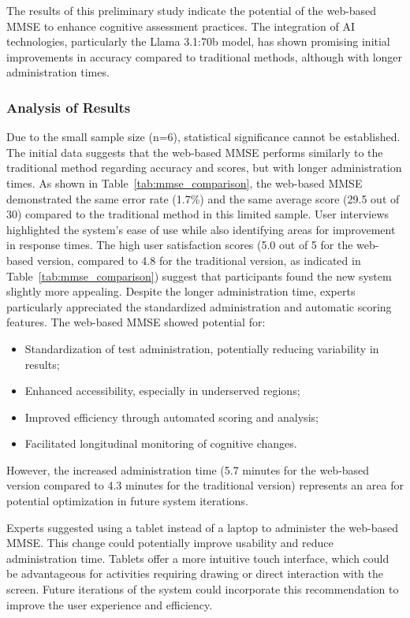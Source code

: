 The results of this preliminary study indicate the potential of the web-based MMSE to enhance cognitive assessment practices. The integration of AI technologies, particularly the Llama 3.1:70b model, has shown promising initial improvements in accuracy compared to traditional methods, although with longer administration times.

\subsubsection{Analysis of Results}
Due to the small sample size (n=6), statistical significance cannot be established. The initial data suggests that the web-based MMSE performs similarly to the traditional method regarding accuracy and scores, but with longer administration times. As shown in Table~\ref{tab:mmse_comparison}, the web-based MMSE demonstrated the same error rate (1.7\%) and the same average score (29.5 out of 30) compared to the traditional method in this limited sample.
User interviews highlighted the system's ease of use while also identifying areas for improvement in response times. The high user satisfaction scores (5.0 out of 5 for the web-based version, compared to 4.8 for the traditional version, as indicated in Table~\ref{tab:mmse_comparison}) suggest that participants found the new system slightly more appealing. Despite the longer administration time, experts particularly appreciated the standardized administration and automatic scoring features.
The web-based MMSE showed potential for:
\begin{itemize}
\item Standardization of test administration, potentially reducing variability in results;
\item Enhanced accessibility, especially in underserved regions;
\item Improved efficiency through automated scoring and analysis;
\item Facilitated longitudinal monitoring of cognitive changes.
\end{itemize}
However, the increased administration time (5.7 minutes for the web-based version compared to 4.3 minutes for the traditional version) represents an area for potential optimization in future system iterations.

Experts suggested using a tablet instead of a laptop to administer the web-based MMSE. This change could potentially improve usability and reduce administration time. Tablets offer a more intuitive touch interface, which could be advantageous for activities requiring drawing or direct interaction with the screen. Future iterations of the system could incorporate this recommendation to improve the user experience and efficiency.

